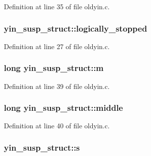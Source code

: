 Definition at line 35 of file oldyin.\+c.

\subsubsection[{\texorpdfstring{logically\+\_\+stopped}{logically_stopped}}]{ yin\+\_\+susp\+\_\+struct\+::logically\+\_\+stopped}\hypertarget{structyin__susp__struct_abeef0ed483d9b85ddf4c02d2cff8bcec}{}\label{structyin__susp__struct_abeef0ed483d9b85ddf4c02d2cff8bcec}


Definition at line 27 of file oldyin.\+c.

\subsubsection[{\texorpdfstring{m}{m}}]{\setlength{\rightskip}{0pt plus 5cm}long yin\+\_\+susp\+\_\+struct\+::m}\hypertarget{structyin__susp__struct_ad4c2052aa918a157ac89a56b3f44191e}{}\label{structyin__susp__struct_ad4c2052aa918a157ac89a56b3f44191e}


Definition at line 39 of file oldyin.\+c.

\subsubsection[{\texorpdfstring{middle}{middle}}]{\setlength{\rightskip}{0pt plus 5cm}long yin\+\_\+susp\+\_\+struct\+::middle}\hypertarget{structyin__susp__struct_a3d35ef2064fcba2280b537ad3124467b}{}\label{structyin__susp__struct_a3d35ef2064fcba2280b537ad3124467b}


Definition at line 40 of file oldyin.\+c.

\subsubsection[{\texorpdfstring{s}{s}}]{ yin\+\_\+susp\+\_\+struct\+::s}\hypertarget{structyin__susp__struct_a8877982a4c335caab398bee5f8c71e33}{}\label{structyin__susp__struct_a8877982a4c335caab398bee5f8c71e33}


